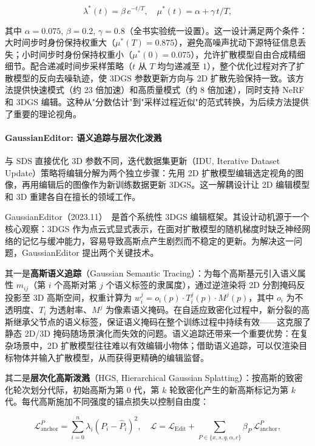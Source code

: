 \begin{equation}
  \lambda^*(t) = \beta \, e^{-t/T}, \quad \mu^*(t) = \alpha + \gamma \, t/T,
\end{equation}

其中 $\alpha=0.075$, $\beta=0.2$, $\gamma=0.8$（全书实验统一设置）。这一设计满足两个条件：大时间步时身份保持权重大（$\mu^*(T) = 0.875$），避免高噪声扰动下源特征信息丢失；小时间步时身份保持权重小（$\mu^*(0) = 0.075$），允许扩散模型自由合成精细细节。配合递减时间步采样策略（$t$ 从 $T$ 均匀递减至 $1$），整个优化过程对齐了扩散模型的反向去噪轨迹，使 3DGS 参数更新方向与 2D 扩散先验保持一致。该方法提供快速模式（约 23 倍加速）和高质量模式（约 8 倍加速），同时支持 NeRF 和 3DGS 编辑。这种从"分数估计"到"采样过程近似"的范式转换，为后续方法提供了重要的理论视角。

\paragraph{GaussianEditor: 语义追踪与层次化泼溅}

与 SDS 直接优化 3D 参数不同，迭代数据集更新（IDU, Iterative Dataset Update）策略将编辑分解为两个独立步骤：先用 2D 扩散模型编辑选定视角的图像，再用编辑后的图像作为新训练数据更新 3DGS。这一解耦设计让 2D 编辑模型和 3D 重建各自在擅长的领域工作。

GaussianEditor（2023.11）~\cite{2311_14521}是首个系统性 3DGS 编辑框架。其设计动机源于一个核心观察：3DGS 作为点云式显式表示，在面对扩散模型的随机梯度时缺乏神经网络的记忆与缓冲能力，容易导致高斯点产生剧烈而不稳定的更新。为解决这一问题，GaussianEditor 提出两个关键技术。

其一是\textbf{高斯语义追踪}（Gaussian Semantic Tracing）：为每个高斯基元引入语义属性 $m_{ij}$（第 $i$ 个高斯对第 $j$ 个语义标签的隶属度），通过逆渲染将 2D 分割掩码反投影至 3D 高斯空间，权重计算为 $w_i^j = o_i(p) \cdot T_i^j(p) \cdot M^j(p)$，其中 $o_i$ 为不透明度、$T_i$ 为透射率、$M^j$ 为像素语义掩码。在自适应致密化过程中，新分裂的高斯继承父节点的语义标签，保证语义掩码在整个训练过程中持续有效——这克服了静态 2D/3D 掩码随场景演化而失效的问题。语义追踪还带来一个重要优势：在复杂场景中，2D 扩散模型往往难以有效编辑小物体；借助语义追踪，可以仅渲染目标物体并输入扩散模型，从而获得更精确的编辑监督。

其二是\textbf{层次化高斯泼溅}（HGS, Hierarchical Gaussian Splatting）：按高斯的致密化轮次划分代际，初始高斯为第 0 代，第 $k$ 轮致密化产生的新高斯标记为第 $k$ 代。每代高斯施加不同强度的锚点损失以控制自由度：

\begin{equation}
  \mathcal{L}^P_{\text{anchor}} = \sum_{i=0}^{n} \lambda_i (P_i - \hat{P}_i)^2, \quad \mathcal{L} = \mathcal{L}_{\text{Edit}} + \sum_{P \in \{x, s, q, \alpha, c\}} \beta_P \, \mathcal{L}^P_{\text{anchor}},
\end{equation}

